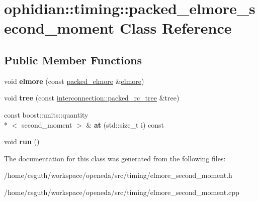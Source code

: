 \hypertarget{classophidian_1_1timing_1_1packed__elmore__second__moment}{\section{ophidian\-:\-:timing\-:\-:packed\-\_\-elmore\-\_\-second\-\_\-moment Class Reference}
\label{classophidian_1_1timing_1_1packed__elmore__second__moment}
}
\subsection*{Public Member Functions}
\begin{DoxyCompactItemize}
\item 
\hypertarget{classophidian_1_1timing_1_1packed__elmore__second__moment_a40aa7a7df934ad699a1d61cd9b91a00e}{void {\bfseries elmore} (const \hyperlink{classophidian_1_1timing_1_1packed__elmore}{packed\-\_\-elmore} \&\hyperlink{classophidian_1_1timing_1_1elmore}{elmore})}\label{classophidian_1_1timing_1_1packed__elmore__second__moment_a40aa7a7df934ad699a1d61cd9b91a00e}

\item 
\hypertarget{classophidian_1_1timing_1_1packed__elmore__second__moment_a1e60f1df8a8a6c0d5cdaf274cc2dcda8}{void {\bfseries tree} (const \hyperlink{classophidian_1_1interconnection_1_1packed__rc__tree}{interconnection\-::packed\-\_\-rc\-\_\-tree} \&tree)}\label{classophidian_1_1timing_1_1packed__elmore__second__moment_a1e60f1df8a8a6c0d5cdaf274cc2dcda8}

\item 
\hypertarget{classophidian_1_1timing_1_1packed__elmore__second__moment_a9c21981650d0426ab37d89e57e9351e6}{const boost\-::units\-::quantity\\*
$<$ second\-\_\-moment $>$ \& {\bfseries at} (std\-::size\-\_\-t i) const }\label{classophidian_1_1timing_1_1packed__elmore__second__moment_a9c21981650d0426ab37d89e57e9351e6}

\item 
\hypertarget{classophidian_1_1timing_1_1packed__elmore__second__moment_aab3ab7cd065b2245b6d69237b5951b61}{void {\bfseries run} ()}\label{classophidian_1_1timing_1_1packed__elmore__second__moment_aab3ab7cd065b2245b6d69237b5951b61}

\end{DoxyCompactItemize}


The documentation for this class was generated from the following files\-:\begin{DoxyCompactItemize}
\item 
/home/csguth/workspace/openeda/src/timing/elmore\-\_\-second\-\_\-moment.\-h\item 
/home/csguth/workspace/openeda/src/timing/elmore\-\_\-second\-\_\-moment.\-cpp\end{DoxyCompactItemize}
